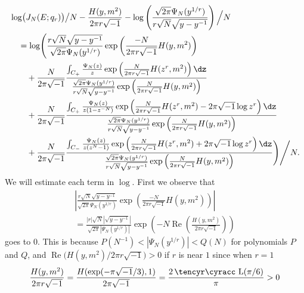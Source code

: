 \documentclass[a4paper]{amsart}
\def\cyr{\tencyr\cyracc}
\theoremstyle{plain}
\theoremstyle{definition}
\theoremstyle{remark}
\newcommand{\Lob}{\operatorname{\text{\cyr L}}}
\renewcommand{\Re}{\operatorname{Re}}
\numberwithin{equation}{section}
\begin{document}
\begin{equation}\label{eq:log/N}
\begin{split}
  &
  \log\bigl(J_N(E;q_r)\bigr)\big/N
  -
  \frac{H(y,m^2)}{2\pi{r}\sqrt{-1}}
  -
  \log\left(
        \frac{\sqrt{2\pi}\Psi_N(y^{1/r})}{r\sqrt{N}\sqrt{y-y^{-1}}}
      \right)\Big/N
  \\
  &\quad
  =
  \log
  \Biggl(
    \frac{r\sqrt{N}\sqrt{y-y^{-1}}}{\sqrt{2\pi}\Psi_N(y^{1/r})}
    \exp\left(\frac{-N}{2\pi{r}\sqrt{-1}}H(y,m^2)\right)
  \\
  &\quad\quad
  +
  \frac{N}{2\pi\sqrt{-1}}
  \frac{\int_{C_+}\frac{\Psi_N(z)}{z}
        \exp\left(\frac{N}{2\pi{r}\sqrt{-1}}H(z^r,m^2)\right)\dz}
       {\frac{\sqrt{2\pi}\Psi_N(y^{1/r})}{r\sqrt{N}\sqrt{y-y^{-1}}}
         \exp\left(
               \frac{N}{2\pi{r}\sqrt{-1}}H(y,m^2)
             \right)}
  \\
  &\quad\quad
  +
  \frac{N}{2\pi\sqrt{-1}}
  \frac{\int_{C_+}\frac{\Psi_N(z)}{z(1-z^{-N})}
        \exp
        \left(
          \frac{N}{2\pi{r}\sqrt{-1}}H(z^r,m^2)-2\pi\sqrt{-1}\log{z^r}
        \right)\dz}
       {\frac{\sqrt{2\pi}\Psi_N(y^{1/r})}{r\sqrt{N}\sqrt{y-y^{-1}}}
         \exp\left(
               \frac{N}{2\pi{r}\sqrt{-1}}H(y,m^2)
             \right)}
  \\
  &\quad\quad
  +
    \frac{N}{2\pi\sqrt{-1}}
    \frac{\int_{C_-}\frac{\Psi_N(z)}{z(z^{N}-1)}
          \exp
          \left(
            \frac{N}{2\pi{r}\sqrt{-1}}H(z^r,m^2)+2\pi\sqrt{-1}\log{z^r}
          \right)\dz}
         {\frac{\sqrt{2\pi}\Psi_N(y^{1/r})}{r\sqrt{N}\sqrt{y-y^{-1}}}
           \exp\left(
                 \frac{N}{2\pi{r}\sqrt{-1}}H(y,m^2)
               \right)}
  \Biggr)
  \Bigg/N.
\end{split}
\end{equation}
We will estimate each term in $\log$.
First we observe that
\begin{multline*}
  \left|
    \frac{r\sqrt{N}\sqrt{y-y^{-1}}}{\sqrt{2\pi}\Psi_N(y^{1/r})}
    \exp\left(\frac{-N}{2\pi{r}\sqrt{-1}}H(y,m^2)\right)
  \right|
  \\
  =
  \frac{|r|\sqrt{N}|\sqrt{y-y^{-1}}|}{\sqrt{2\pi}\left|\Psi_N(y^{1/r})\right|}
  \exp\left(-N\Re\left(\frac{H(y,m^2)}{2\pi{r}\sqrt{-1}}\right)\right)
\end{multline*}
goes to $0$.
This is because $P(N^{-1})<|\Psi_N(y^{1/r})|<Q(N)$ for polynomials $P$ and $Q$,
and $\Re\bigl(H(y,m^2)/2\pi{r}\sqrt{-1}\bigr)>0$ if $r$ is near $1$ since
when $r=1$
\begin{equation*}
  \frac{H(y,m^2)}{2\pi{r}\sqrt{-1}}
  =
  \frac{H(\exp(-\pi\sqrt{-1}/3),1)}{2\pi\sqrt{-1}}
  =
  \frac{2\Lob(\pi/6)}{\pi}
  >
  0
\end{equation*}
\end{document}
